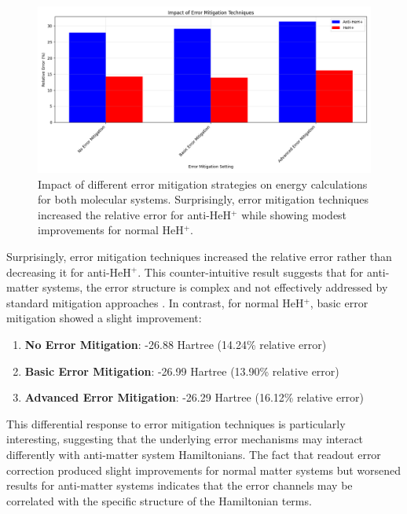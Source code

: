 \documentclass[10pt,twocolumn,a4paper]{article}
\begin{document}
\begin{figure}[t!]
    \centering
    \includegraphics[width=\columnwidth]{graphs/error_mitigation_impact.png}
    \caption{Impact of different error mitigation strategies on energy calculations for both molecular systems. Surprisingly, error mitigation techniques increased the relative error for anti-HeH$^+$ while showing modest improvements for normal HeH$^+$.}
    \label{fig:error_mitigation}
\end{figure}

Surprisingly, error mitigation techniques increased the relative error rather than decreasing it for anti-HeH$^+$. This counter-intuitive result suggests that for anti-matter systems, the error structure is complex and not effectively addressed by standard mitigation approaches \cite{temme2017error}. In contrast, for normal HeH$^+$, basic error mitigation showed a slight improvement:

\begin{enumerate}
    \item \textbf{No Error Mitigation}: -26.88 Hartree (14.24\% relative error)
    \item \textbf{Basic Error Mitigation}: -26.99 Hartree (13.90\% relative error)
    \item \textbf{Advanced Error Mitigation}: -26.29 Hartree (16.12\% relative error)
\end{enumerate}

This differential response to error mitigation techniques is particularly interesting, suggesting that the underlying error mechanisms may interact differently with anti-matter system Hamiltonians. The fact that readout error correction produced slight improvements for normal matter systems but worsened results for anti-matter systems indicates that the error channels may be correlated with the specific structure of the Hamiltonian terms.
\end{document}
